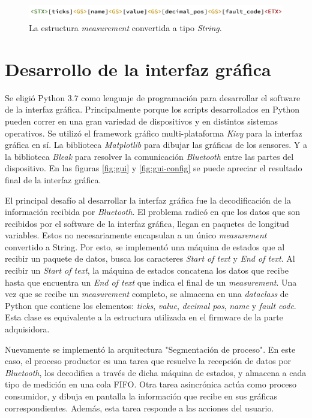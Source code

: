 \begin{figure}[htpb]
\centering
\includegraphics[width=.9\textwidth]{./Figures/measurement-string.png}
\caption{La estructura \textit{measurement} convertida a tipo \textit{String}.}
\label{fig:measurement-string}
\end{figure}


\section{Desarrollo de la interfaz gráfica}

Se eligió Python 3.7 como lenguaje de programación para desarrollar el software de la interfaz gráfica. Principalmente porque los scripts desarrollados en Python pueden correr en una gran variedad de dispositivos y en distintos sistemas operativos. Se utilizó el framework gráfico multi-plataforma \textit{Kivy} para la interfaz gráfica en sí. La biblioteca \textit{Matplotlib} para dibujar las gráficas de los sensores. Y a la biblioteca \textit{Bleak} para resolver la comunicación \textit{Bluetooth} entre las partes del dispositivo. En las figuras \ref{fig:gui} y \ref{fig:gui-config} se puede apreciar el resultado final de la interfaz gráfica.

El principal desafío al desarrollar la interfaz gráfica fue la decodificación de la información recibida por \textit{Bluetooth}. 
El problema radicó en que los datos que son recibidos por el software de la interfaz gráfica, llegan en paquetes de longitud variables. Estos no necesariamente encapsulan a un único \textit{measurement} convertido a String. Por esto, se implementó una máquina de estados que al recibir un paquete de datos, busca los caracteres \textit{Start of text} y \textit{End of text}. Al recibir un \textit{Start of text}, la máquina de estados concatena los datos que recibe hasta que encuentra un \textit{End of text} que indica el final de un \textit{measurement}. Una vez que se recibe un \textit{measurement} completo, se almacena en una \textit{dataclass} de Python que contiene los elementos: \textit{ticks}, \textit{value}, \textit{decimal pos}, \textit{name} y \textit{fault code}. Esta clase es equivalente a la estructura utilizada en el firmware de la parte adquisidora.

Nuevamente se implementó la arquitectura "Segmentación de proceso". En este caso, el proceso productor es una tarea que resuelve la recepción de datos por \textit{Bluetooth}, los decodifica a través de dicha máquina de estados, y almacena a cada tipo de medición en una cola FIFO. Otra tarea asincrónica actúa como proceso consumidor, y dibuja en pantalla la información que recibe en sus gráficas correspondientes. Además, esta tarea responde a las acciones del usuario.

